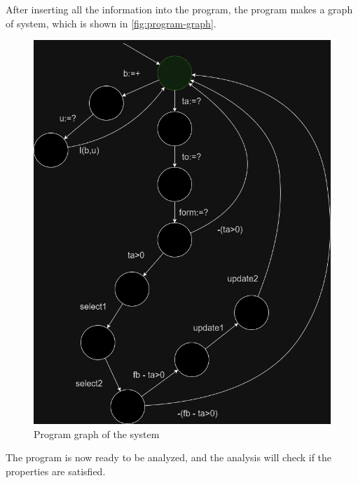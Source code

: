 After inserting all the information into the program, the program makes a graph of system, which is shown in \autoref{fig:program-graph}.


\begin{figure}[htb!]
    \centering
    \includegraphics[width=0.8\columnwidth]{figures/program_graph}
    \caption{Program graph of the system}
    \label{fig:program-graph}
\end{figure}


The program is now ready to be analyzed, and the analysis will check if the properties are satisfied.


